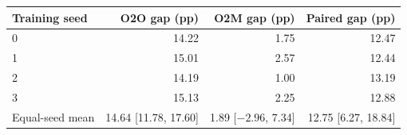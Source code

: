 \begin{tabular}{@{}lrrr@{}}
\toprule
Training seed & O2O gap (pp) & O2M gap (pp) & Paired gap (pp) \\
\midrule
0 & 14.22 & 1.75 & 12.47 \\
1 & 15.01 & 2.57 & 12.44 \\
2 & 14.19 & 1.00 & 13.19 \\
3 & 15.13 & 2.25 & 12.88 \\
\midrule
Equal-seed mean & 14.64 [11.78, 17.60] & 1.89 [$-2.96$, 7.34] & 12.75 [6.27, 18.84] \\
\bottomrule
\end{tabular}
